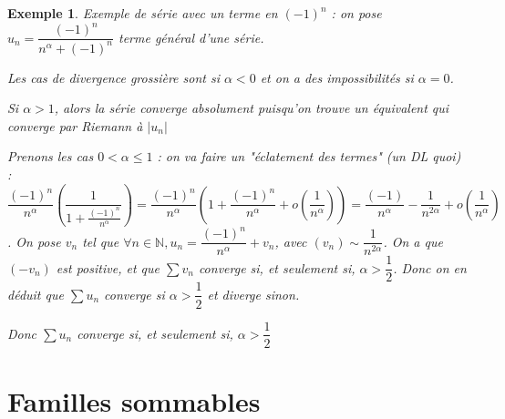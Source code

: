 \documentclass[a4paper,12pt]{book}
\newtheorem{Exe}{Exemple}[section]
\def\N{\mathbb{N}}
\begin{document}
\begin{Exe}
Exemple de série avec un terme en $(-1)^n$ : on pose $u_n = \dfrac{(-1)^n}{n^\alpha + (-1)^n}$ terme général d'une série.
\par Les cas de divergence grossière sont si $\alpha< 0$ et on a des impossibilités si $\alpha =0$.
\par Si $\alpha>1$, alors la série converge absolument puisqu'on trouve un équivalent qui converge par Riemann à $\vert u_n\vert$
\par Prenons les cas $0<\alpha\leq 1$ : on va faire un "éclatement des termes" (un DL quoi) : $\dfrac{(-1)^n}{n^\alpha}\left(\dfrac{1}{1+\frac{(-1)^n}{n^\alpha}}\right) = \dfrac{(-1)^n}{n^\alpha}\left(1+\dfrac{(-1)^n}{n^\alpha} + o(\dfrac{1}{n^\alpha})\right) = \dfrac{(-1)}{n^\alpha} - \dfrac{1}{n^{2\alpha}} + o(\dfrac{1}{n^\alpha})$. On pose $v_n$ tel que $\forall n\in\N, u_n =\dfrac{(-1)^n}{n^\alpha}+ v_n$, avec $(v_n)\sim\dfrac{1}{n^{2\alpha}}$. On a que $(-v_n)$ est positive, et que $\sum v_n$ converge si, et seulement si, $\alpha >\dfrac{1}{2}$. Donc on en déduit que $\sum u_n$ converge si $\alpha >\dfrac{1}{2}$ et diverge sinon.
\par Donc $\sum u_n$ converge si, et seulement si, $\alpha >\dfrac{1}{2}$
\end{Exe}



\chapter{Familles sommables}
\end{document}
